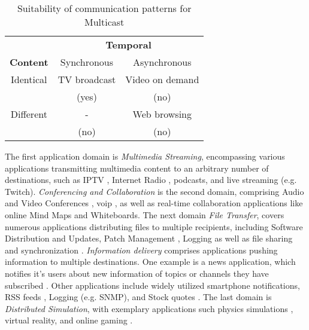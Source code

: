 \begin{table}
    \centering
    \begin{tabular}{ccc}
    \toprule
        & \multicolumn{2}{c}{\textbf{Temporal}} \\
        \cmidrule{2-3}
        \textbf{Content} & Synchronous & Asynchronous \\
    \midrule
        Identical & TV broadcast & Video on demand \\
                  & (yes)        & (no) \\
        \addlinespace
        Different & -            & Web browsing \\
                  & (no)         & (no) \\
    \bottomrule
    \end{tabular}
    \caption{Suitability of communication patterns for Multicast}
    \label{tab:mccomm}
\end{table}

The first application domain is \textit{Multimedia Streaming}, encompassing 
    various applications transmitting multimedia content to an arbitrary number
    of destinations, such as IPTV \cite{meadcast2, ratnasamy2006revisiting},
    Internet Radio \cite{meadcast1}, podcasts, and live streaming (e.g.
    Twitch).
\textit{Conferencing and Collaboration} is the second domain, comprising Audio
    and Video Conferences \cite{overlay_mc_routing, meadcast2,
    mc_routing_multimedia}, \gls{voip} \cite{gxcast, xcast_rfc}, as well as
    real-time collaboration applications \cite{diot2000deployment, xcast_rfc}
    like online Mind Maps and Whiteboards.
The next domain \textit{File Transfer}, covers numerous applications 
    distributing files to multiple recipients, including Software Distribution
    and Updates, Patch Management \cite{meadcast1, ratnasamy2006revisiting}, 
    Logging \cite{diot2000deployment} as well as file sharing and
    synchronization \cite{overlay_mc_routing}.
\textit{Information delivery} comprises applications pushing information to 
    multiple destinations.
One example is a news application, which notifies it's users about new
    information of topics or channels they have subscribed
    \cite{diot2000deployment}.
Other applications include widely utilized smartphone notifications, RSS feeds
    \cite{ratnasamy2006revisiting}, Logging (e.g. SNMP), and Stock quotes
    \cite{cisco_ipmc}.
The last domain is \textit{Distributed Simulation}, with exemplary applications
    such physics simulations \cite{diot2000deployment}, virtual reality, and
    online gaming \cite{ratnasamy2006revisiting}.


